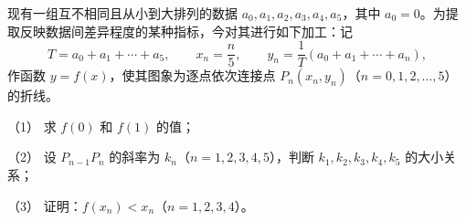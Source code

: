 \begin{question}
现有一组互不相同且从小到大排列的数据 $a_0,a_1,a_2,a_3,a_4,a_5$，其中 $a_0=0$。为提取反映数据间差异程度的某种指标，今对其进行如下加工：记
\nopagebreak[4]
\[
T=a_0+a_1+\cdots+a_5,\qquad x_n=\frac{n}{5},\qquad y_n=\frac{1}{T}(a_0+a_1+\cdots+a_n),
\]
作函数 $y=f(x)$，使其图象为逐点依次连接点 $P_n(x_n,y_n)$（$n=0,1,2,\ldots,5$）的折线。

（1） 求 $f(0)$ 和 $f(1)$ 的值；

（2） 设 $P_{n-1}P_n$ 的斜率为 $k_n$（$n=1,2,3,4,5$），判断 $k_1,k_2,k_3,k_4,k_5$ 的大小关系；

（3） 证明：$f(x_n)<x_n$（$n=1,2,3,4$）。

\end{question}
